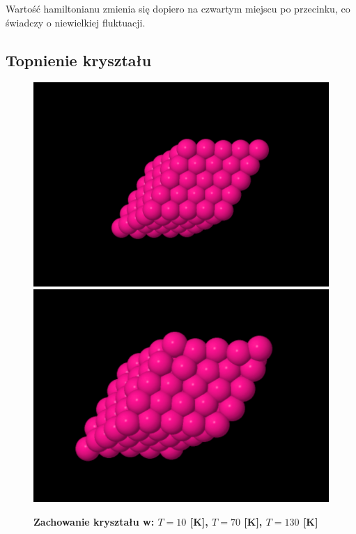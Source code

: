 \documentclass[11pt,a4paper]{article}
\begin{document}
 Wartość hamiltonianu zmienia się dopiero na czwartym miejscu po przecinku, co świadczy o niewielkiej fluktuacji.

\subsection{Topnienie kryształu}

\begin{figure}[ht!]
\caption{\textbf{Zachowanie kryształu w: $T=10$ [K], $T=70$ [K], $T=130$ [K]}}
\begin{multicols}{3}
    \includegraphics[width=\linewidth]{../figures/crystal.png}
    \includegraphics[width=\linewidth]{../figures/melting.png}

\end{multicols}
\end{figure}
\end{document}
